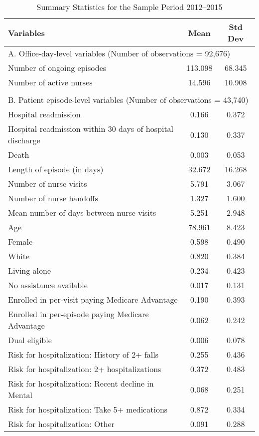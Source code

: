 \documentclass[final,12pt, notitlepage]{article}
\begin{document}
\begin{singlespace}

\newpage
{\footnotesize
\begin{longtable}{lcc}
\caption{Summary Statistics for the Sample Period 2012--2015}
\label{tab:summstats}\\
\toprule
Variables & Mean & Std Dev \\
\midrule
\multicolumn{3}{l}{A. Office-day-level variables (Number of observations = 92,676)} \\
Number of ongoing episodes  &  113.098 & 68.345 \\
Number of active nurses      & 14.596   & 10.908 \\
\\
\multicolumn{3}{l}{B. Patient episode-level variables (Number of observations = 43,740)} \\
Hospital readmission & 0.166 & 0.372 \\
Hospital readmission within 30 days of hospital discharge & 0.130 & 0.337 \\
Death & 0.003 & 0.053 \\
Length of episode (in days) & 32.672 & 16.268 \\
Number of nurse visits & 5.791 & 3.067 \\
Number of nurse handoffs & 1.327 & 1.600 \\
Mean number of days between nurse visits & 5.251 & 2.948 \\
Age & 78.961 & 8.423 \\
Female & 0.598 & 0.490 \\
White & 0.820 & 0.384 \\
Living alone & 0.234 & 0.423 \\
No assistance available & 0.017 & 0.131 \\
Enrolled in per-visit paying Medicare Advantage & 0.190 & 0.393 \\
Enrolled in per-episode paying Medicare Advantage & 0.062 & 0.242 \\
Dual eligible & 0.006 & 0.078 \\
Risk for hospitalization: History of 2+ falls & 0.255 & 0.436 \\
Risk for hospitalization: 2+ hospitalizations & 0.372 & 0.483 \\
Risk for hospitalization: Recent decline in Mental & 0.068 & 0.251 \\
Risk for hospitalization: Take 5+ medications & 0.872 & 0.334 \\
Risk for hospitalization: Other & 0.091 & 0.288 \\

\end{longtable}}
\end{singlespace}
\end{document}
